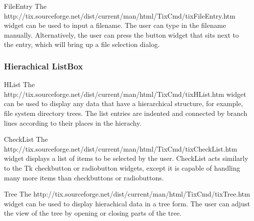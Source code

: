 
\begin{classdesc}{FileEntry}{}
The 
{http://tix.sourceforge.net/dist/current/man/html/TixCmd/tixFileEntry.htm}
widget can be used to input a filename. The user can type in the
filename manually. Alternatively, the user can press the button widget
that sits next to the entry, which will bring up a file selection
dialog.
\end{classdesc}



\subsubsection{Hierachical ListBox}

\begin{classdesc}{HList}{}
The 
{http://tix.sourceforge.net/dist/current/man/html/TixCmd/tixHList.htm}
widget can be used to display any data that have a hierarchical
structure, for example, file system directory trees. The list entries
are indented and connected by branch lines according to their places
in the hierachy.
\end{classdesc}


\begin{classdesc}{CheckList}{}
The 
{http://tix.sourceforge.net/dist/current/man/html/TixCmd/tixCheckList.htm}
widget displays a list of items to be selected by the user. CheckList
acts similarly to the Tk checkbutton or radiobutton widgets, except it
is capable of handling many more items than checkbuttons or
radiobuttons.
\end{classdesc}


\begin{classdesc}{Tree}{}
The 
{http://tix.sourceforge.net/dist/current/man/html/TixCmd/tixTree.htm}
widget can be used to display hierachical data in a tree form. The
user can adjust the view of the tree by opening or closing parts of
the tree.
\end{classdesc}

